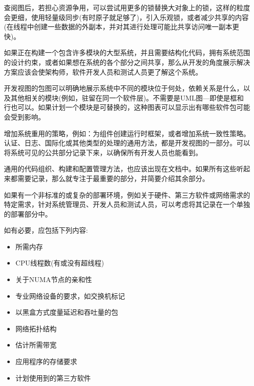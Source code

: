 查阅图后，若担心资源争用，可以尝试用更多的锁替换大对象上的锁，这样的粒度会更细，使用轻量级同步(有时原子就足够了)，引入乐观锁，或者减少共享的内容(在线程中创建一些数据的外副本，并对其进行处理可能比共享访问唯一副本更快)。


如果正在构建一个包含许多模块的大型系统，并且需要结构化代码，拥有系统范围的设计约束，或者如果想在系统的各个部分之间共享，那么从开发的角度展示解决方案应该会使架构师，软件开发人员和测试人员更了解这个系统。

开发视图的包图可以明确地展示系统中不同的模块位于何处，依赖关系是什么，以及其他相关的模块(例如，驻留在同一个软件层)。不需要是UML图—即使是框和行也可以。如果计划一个模块是可替换的，这种图表可以显示出有哪些软件包可能会受到影响。

增加系统重用的策略，例如：为组件创建运行时框架，或者增加系统一致性策略。认证、日志、国际化或其他类型的处理的通用方法，都是开发视图的一部分。可以将系统可见的公共部分记录下来，以确保所有开发人员也能看到。

通用的代码组织、构建和配置管理方法，也应该出现在文档中。如果所有这些听起来都需要记录，那么就专注于最重要的部分，并简要介绍其余部分。


如果有一个非标准的或复杂的部署环境，例如关于硬件、第三方软件或网络需求的特定需求，针对系统管理员、开发人员和测试人员，可以考虑将其记录在一个单独的部署部分中。

如有必要，应包括下列内容:

\begin{itemize}
\item
所需内存

\item 
CPU线程数(有或没有超线程)

\item 
关于NUMA节点的亲和性

\item 
专业网络设备的要求，如交换机标记

\item 
以黑盒方式度量延迟和吞吐量的包

\item 
网络拓扑结构

\item 
估计所需带宽

\item 
应用程序的存储要求

\item 
计划使用到的第三方软件
\end{itemize}

